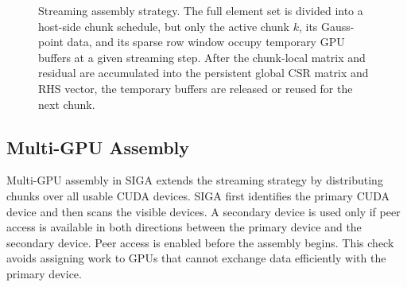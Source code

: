 \documentclass[11pt]{article}
\begin{document}
\begin{figure}[H]
{%
}
\caption{Streaming assembly strategy. The full element set is divided into a host-side chunk schedule, but only the active chunk \(k\), its Gauss-point data, and its sparse row window occupy temporary GPU buffers at a given streaming step. After the chunk-local matrix and residual are accumulated into the persistent global CSR matrix and RHS vector, the temporary buffers are released or reused for the next chunk.}
\label{fig:streaming_assembly}
\end{figure}
\FloatBarrier

\subsection{Multi-GPU Assembly}

Multi-GPU assembly in SIGA extends the streaming strategy by distributing chunks over all usable CUDA devices. SIGA first identifies the primary CUDA device and then scans the visible devices. A secondary device is used only if peer access is available in both directions between the primary device and the secondary device. Peer access is enabled before the assembly begins. This check avoids assigning work to GPUs that cannot exchange data efficiently with the primary device.
\end{document}
